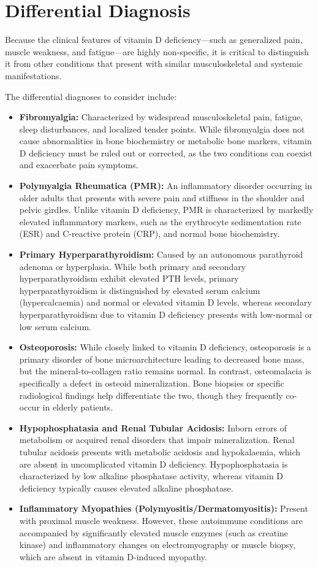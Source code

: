 \section*{Differential Diagnosis}
Because the clinical features of vitamin D deficiency---such as generalized pain, muscle weakness, and fatigue---are highly non-specific, it is critical to distinguish it from other conditions that present with similar musculoskeletal and systemic manifestations.

The differential diagnoses to consider include:
\begin{itemize}
    \item \textbf{Fibromyalgia:} Characterized by widespread musculoskeletal pain, fatigue, sleep disturbances, and localized tender points. While fibromyalgia does not cause abnormalities in bone biochemistry or metabolic bone markers, vitamin D deficiency must be ruled out or corrected, as the two conditions can coexist and exacerbate pain symptoms.
    \item \textbf{Polymyalgia Rheumatica (PMR):} An inflammatory disorder occurring in older adults that presents with severe pain and stiffness in the shoulder and pelvic girdles. Unlike vitamin D deficiency, PMR is characterized by markedly elevated inflammatory markers, such as the erythrocyte sedimentation rate (ESR) and C-reactive protein (CRP), and normal bone biochemistry.
    \item \textbf{Primary Hyperparathyroidism:} Caused by an autonomous parathyroid adenoma or hyperplasia. While both primary and secondary hyperparathyroidism exhibit elevated PTH levels, primary hyperparathyroidism is distinguished by elevated serum calcium (hypercalcaemia) and normal or elevated vitamin D levels, whereas secondary hyperparathyroidism due to vitamin D deficiency presents with low-normal or low serum calcium.
    \item \textbf{Osteoporosis:} While closely linked to vitamin D deficiency, osteoporosis is a primary disorder of bone microarchitecture leading to decreased bone mass, but the mineral-to-collagen ratio remains normal. In contrast, osteomalacia is specifically a defect in osteoid mineralization. Bone biopsies or specific radiological findings help differentiate the two, though they frequently co-occur in elderly patients.
    \item \textbf{Hypophosphatasia and Renal Tubular Acidosis:} Inborn errors of metabolism or acquired renal disorders that impair mineralization. Renal tubular acidosis presents with metabolic acidosis and hypokalaemia, which are absent in uncomplicated vitamin D deficiency. Hypophosphatasia is characterized by low alkaline phosphatase activity, whereas vitamin D deficiency typically causes elevated alkaline phosphatase.
    \item \textbf{Inflammatory Myopathies (Polymyositis/Dermatomyositis):} Present with proximal muscle weakness. However, these autoimmune conditions are accompanied by significantly elevated muscle enzymes (such as creatine kinase) and inflammatory changes on electromyography or muscle biopsy, which are absent in vitamin D-induced myopathy.
\end{itemize}

